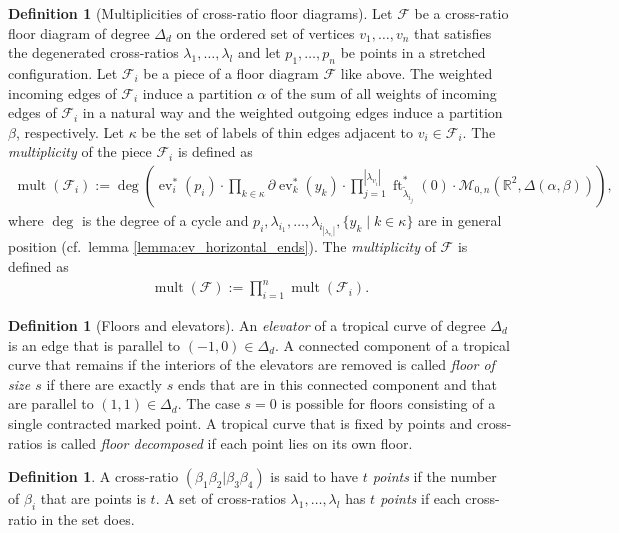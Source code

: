 \documentclass[11pt,reqno,a4]{amsart}
\theoremstyle{dotless}
\theoremstyle{definition}
\newtheorem{definition}[corollary]{Definition}
\newcommand{\mult}{\operatorname{mult}}
\newcommand{\ft}{\operatorname{ft}}
\newcommand{\ev}{\operatorname{ev}}
\newcommand{\degree}{\operatorname{deg}}
\begin{document}
\begin{definition}[Multiplicities of cross-ratio floor diagrams]\label{definition:multiplicities_cross-ratio_floor_diagrams}
Let $\mathcal{F}$ be a cross-ratio floor diagram of degree $\Delta_d$ on the ordered set of vertices $v_1,\dots,v_n$ that satisfies the degenerated cross-ratios $\lambda_1,\dots,\lambda_l$ and let $p_1,\dots,p_n$ be points in a stretched configuration. Let $\mathcal{F}_i$ be a piece of a floor diagram $\mathcal{F}$ like above. The weighted incoming edges of $\mathcal{F}_i$ induce a partition $\alpha$ of the sum of all weights of incoming edges of $\mathcal{F}_i$ in a natural way and the weighted outgoing edges induce a partition $\beta$, respectively. Let $\kappa$ be the set of labels of thin edges adjacent to $v_i\in\mathcal{F}_i$. The \textit{multiplicity} of the piece $\mathcal{F}_i$ is defined as
\begin{align*}
\mult(\mathcal{F}_i):=\degree \left( \ev^*_i(p_i) \cdot \prod_{k\in\kappa}\partial\ev_k^*\left( y_k \right)\cdot\prod_{j=1}^{|\lambda_{v_i}|}\ft_{\tilde{\lambda}_{i_j}}^*\left( 0\right) \cdot \mathcal{M}_{0,n}\left(\mathbb{R}^2,\Delta\left(\alpha,\beta\right) \right)\right),
\end{align*}
where $\degree$ is the degree of a cycle and $p_i,\lambda_{i_1},\dots,\lambda_{i_{|\lambda_{v_i}|}},\lbrace y_k\mid k\in\kappa\rbrace$ are in general position (cf.\ lemma \ref{lemma:ev_horizontal_ends}). The \textit{multiplicity} of $\mathcal{F}$ is defined as
\begin{align*}
\mult(\mathcal{F}):=\prod_{i=1}^n \mult(\mathcal{F}_i).
\end{align*}
\end{definition}


\begin{definition}[Floors and elevators]
An \textit{elevator} of a tropical curve of degree $\Delta_d$ is an edge that is parallel to $(-1,0)\in\Delta_d$. A connected component of a tropical curve that remains if the interiors of the elevators are removed is called \textit{floor of size $s$} if there are exactly $s$ ends that are in this connected component and that are parallel to $(1,1)\in\Delta_d$. The case $s=0$ is possible for floors consisting of a single contracted marked point. A tropical curve that is fixed by points and cross-ratios is called \textit{floor decomposed} if each point lies on its own floor.
\end{definition}

\begin{definition}\label{definition:4_points_CR}
A cross-ratio $\left(\beta_1\beta_2|\beta_3\beta_4\right)$ is said to have \textit{$t$ points} if the number of $\beta_i$ that are points is $t$. A set of cross-ratios $\lambda_1,\dots,\lambda_l$ has \textit{$t$ points} if each cross-ratio in the set does.
\end{definition}
\end{document}
